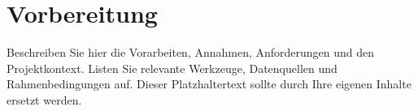 \section{Vorbereitung}

Beschreiben Sie hier die Vorarbeiten, Annahmen, Anforderungen und den
Projektkontext. Listen Sie relevante Werkzeuge, Datenquellen und Rahmenbedingungen
auf. Dieser Platzhaltertext sollte durch Ihre eigenen Inhalte ersetzt werden.
